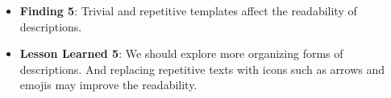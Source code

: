 \begin{itemize}[noitemsep,topsep=0pt,parsep=0pt,partopsep=0pt, leftmargin=20pt]
    \item {\bf Finding 5}: Trivial and repetitive templates affect the readability of descriptions.
    \item {\bf Lesson Learned 5}: We should explore more organizing forms of descriptions. And replacing repetitive texts with icons such as arrows and emojis may improve the readability.
\end{itemize}

